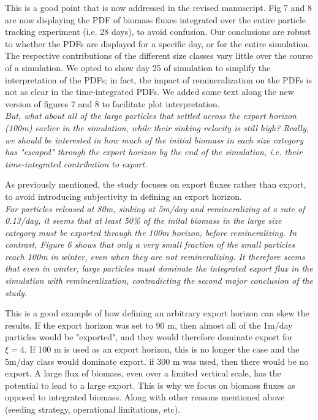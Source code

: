 \documentclass[12pt,letter]{article}
\begin{document}
 This is a good point that is now addressed in the revised manuscript. Fig 7 and 8 are now displaying the PDF of biomass fluxes integrated over the entire particle tracking experiment (i.e. 28 days), to avoid confusion. Our conclusions are robust to whether the PDFs are displayed for a specific day, or for the entire simulation. The respective contributions of the different size classes vary little over the course of a simulation. We opted to show day 25 of simulation to simplify the interpretation of the PDFs; in fact, the impact of remineralization on the PDFs is not as clear in the time-integrated PDFs. We added some text along the new version of figures 7 and 8 to facilitate plot interpretation.\\
 
 \textit{But, what about all of the large particles that settled across the export horizon (100m) earlier in the simulation, while their sinking velocity is still high? Really, we should be interested in how much of the initial biomass in each size category has "escaped" through the export horizon by the end of the simulation, i.e. their time-integrated contribution to export.\\}
 
 As previously mentioned, the study focuses on export fluxes rather than export, to avoid introducing subjectivity in defining an export horizon.\\
 
\textit{For particles released at 80m, sinking at 5m/day and remineralizing at a rate of 0.13/day, it seems that at least 50\% of the inital biomass in the large size category must be exported through the 100m horizon, before remineralizing. In contrast, Figure 6 shows that only a very small fraction of the small particles reach 100m in winter, even when they are not remineralizing. It therefore seems that even in winter, large particles must dominate the integrated export flux in the simulation with remineralization, contradicting the second major conclusion of the study.\\}

This is a good example of how defining an arbitrary export horizon can skew the results. If the export horizon was set to 90 m, then almost all of the 1m/day particles would be "exported", and they would therefore dominate export for $\xi=4$. If 100 m is used as an export horizon, this is no longer the case and the 5m/day class would dominate export. if 300 m was used, then there would be no export. A large flux of biomass, even over a limited vertical scale, has the potential to lead to a large export. This is why we focus on biomass fluxes as opposed to integrated biomass. Along with other reasons mentioned above (seeding strategy, operational limitations, etc).\\
\end{document}
